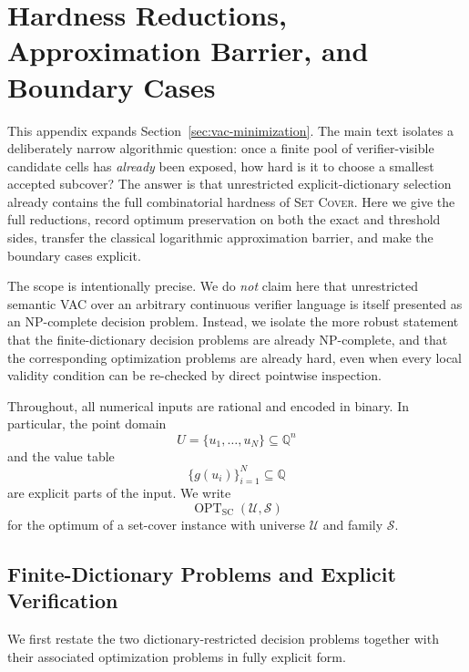 \section{Hardness Reductions, Approximation Barrier, and Boundary Cases}
\label{app:dict-hardness}

This appendix expands Section~\ref{sec:vac-minimization}. The main text isolates a deliberately narrow algorithmic question: once a finite pool of verifier-visible candidate cells has \emph{already} been exposed, how hard is it to choose a smallest accepted subcover? The answer is that unrestricted explicit-dictionary selection already contains the full combinatorial hardness of \textsc{Set Cover}. Here we give the full reductions, record optimum preservation on both the exact and threshold sides, transfer the classical logarithmic approximation barrier, and make the boundary cases explicit.

The scope is intentionally precise. We do \emph{not} claim here that unrestricted semantic VAC over an arbitrary continuous verifier language is itself presented as an NP-complete decision problem. Instead, we isolate the more robust statement that the finite-dictionary decision problems are already NP-complete, and that the corresponding optimization problems are already hard, even when every local validity condition can be re-checked by direct pointwise inspection.

Throughout, all numerical inputs are rational and encoded in binary. In particular, the point domain
\[
U=\{u_1,\dots,u_N\}\subseteq \mathbb Q^n
\]
and the value table
\[
\{g(u_i)\}_{i=1}^N\subseteq \mathbb Q
\]
are explicit parts of the input. We write
\[
\operatorname{OPT}_{\mathrm{SC}}(\mathcal U,\mathcal S)
\]
for the optimum of a set-cover instance with universe $\mathcal U$ and family $\mathcal S$.

\subsection{Finite-Dictionary Problems and Explicit Verification}

We first restate the two dictionary-restricted decision problems together with their associated optimization problems in fully explicit form.

